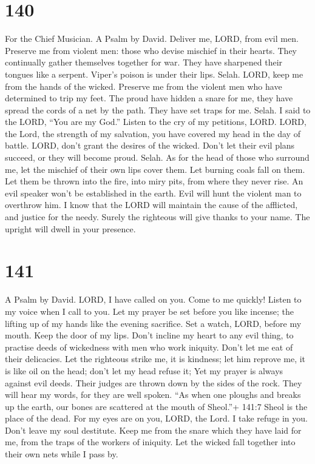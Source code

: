 \hypertarget{section-130}{%
\section{140}\label{section-130}}

For the Chief Musician. A Psalm by David.  Deliver me, LORD,
from evil men. Preserve me from violent men:  those who
devise mischief in their hearts. They continually gather themselves
together for war.  They have sharpened their tongues like a
serpent. Viper's poison is under their lips. Selah.  LORD,
keep me from the hands of the wicked. Preserve me from the violent men
who have determined to trip my feet.  The proud have hidden
a snare for me, they have spread the cords of a net by the path. They
have set traps for me. Selah.  I said to the LORD, ``You are
my God.'' Listen to the cry of my petitions, LORD.  LORD,
the Lord, the strength of my salvation, you have covered my head in the
day of battle.  LORD, don't grant the desires of the wicked.
Don't let their evil plans succeed, or they will become proud. Selah.
 As for the head of those who surround me, let the mischief
of their own lips cover them.  Let burning coals fall on
them. Let them be thrown into the fire, into miry pits, from where they
never rise.  An evil speaker won't be established in the
earth. Evil will hunt the violent man to overthrow him.  I
know that the LORD will maintain the cause of the afflicted, and justice
for the needy.  Surely the righteous will give thanks to
your name. The upright will dwell in your presence.

\hypertarget{section-131}{%
\section{141}\label{section-131}}

A Psalm by David.  LORD, I have called on you. Come to me
quickly! Listen to my voice when I call to you.  Let my
prayer be set before you like incense; the lifting up of my hands like
the evening sacrifice.  Set a watch, LORD, before my mouth.
Keep the door of my lips.  Don't incline my heart to any
evil thing, to practise deeds of wickedness with men who work iniquity.
Don't let me eat of their delicacies.  Let the righteous
strike me, it is kindness; let him reprove me, it is like oil on the
head; don't let my head refuse it; Yet my prayer is always against evil
deeds.  Their judges are thrown down by the sides of the
rock. They will hear my words, for they are well spoken. 
``As when one ploughs and breaks up the earth, our bones are scattered
at the mouth of Sheol.''+ 141:7 Sheol is the place of the dead.
 For my eyes are on you, LORD, the Lord. I take refuge in
you. Don't leave my soul destitute.  Keep me from the snare
which they have laid for me, from the traps of the workers of iniquity.
 Let the wicked fall together into their own nets while I
pass by.

